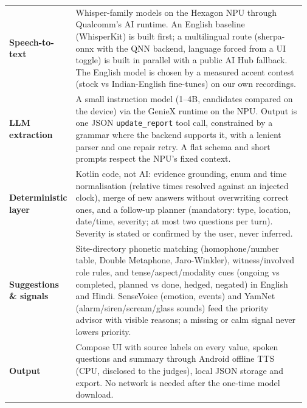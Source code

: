 \documentclass[10pt,a4paper]{article}
\begin{document}
\begin{tabular}{@{}>{\bfseries}p{0.17\linewidth}p{0.80\linewidth}@{}}
\toprule
Speech-to-text & Whisper-family models on the Hexagon NPU through Qualcomm's AI runtime. An English baseline (WhisperKit) is built first; a multilingual route (sherpa-onnx with the QNN backend, language forced from a UI toggle) is built in parallel with a public AI Hub fallback. The English model is chosen by a measured accent contest (stock vs Indian-English fine-tunes) on our own recordings.\\
LLM extraction & A small instruction model (1--4B, candidates compared on the device) via the GenieX runtime on the NPU. Output is one JSON \texttt{update\_report} tool call, constrained by a grammar where the backend supports it, with a lenient parser and one repair retry. A flat schema and short prompts respect the NPU's fixed context.\\
Deterministic layer & Kotlin code, not AI: evidence grounding, enum and time normalisation (relative times resolved against an injected clock), merge of new answers without overwriting correct ones, and a follow-up planner (mandatory: type, location, date/time, severity; at most two questions per turn). Severity is stated or confirmed by the user, never inferred.\\
Suggestions \& signals & Site-directory phonetic matching (homophone/number table, Double Metaphone, Jaro-Winkler), witness/involved role rules, and tense/aspect/modality cues (ongoing vs completed, planned vs done, hedged, negated) in English and Hindi. SenseVoice (emotion, events) and YamNet (alarm/siren/scream/glass sounds) feed the priority advisor with visible reasons; a missing or calm signal never lowers priority.\\
Output & Compose UI with source labels on every value, spoken questions and summary through Android offline TTS (CPU, disclosed to the judges), local JSON storage and export. No network is needed after the one-time model download.\\
\bottomrule
\end{tabular}
\end{document}
